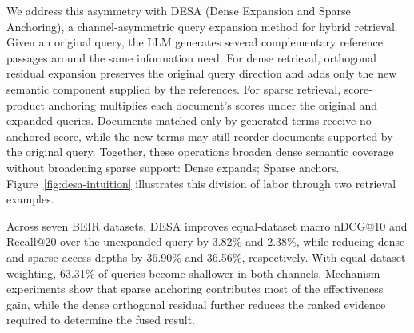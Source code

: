 We address this asymmetry with DESA (Dense Expansion and Sparse Anchoring), a
channel-asymmetric query expansion method for hybrid retrieval. Given an
original query, the LLM generates several complementary reference passages
around the same information need. For dense retrieval, orthogonal residual
expansion preserves the original query direction and adds only the new semantic
component supplied by the references. For sparse retrieval, score-product
anchoring multiplies each document's scores under the original and expanded
queries. Documents matched only by generated terms receive no anchored score,
while the new terms may still reorder documents supported by the original
query. Together, these operations broaden dense semantic coverage without
broadening sparse support: Dense expands; Sparse anchors.
Figure~\ref{fig:desa-intuition} illustrates this division of labor through two
retrieval examples.

Across seven BEIR datasets, DESA improves equal-dataset macro
nDCG@10 and Recall@20 over the unexpanded query by 3.82\% and 2.38\%, while
reducing dense and sparse access depths by 36.90\% and 36.56\%,
respectively. With equal dataset weighting, 63.31\% of queries become shallower
in both channels. Mechanism experiments show that sparse anchoring contributes
most of the effectiveness gain, while the dense orthogonal residual further
reduces the ranked evidence required to determine the fused result.
